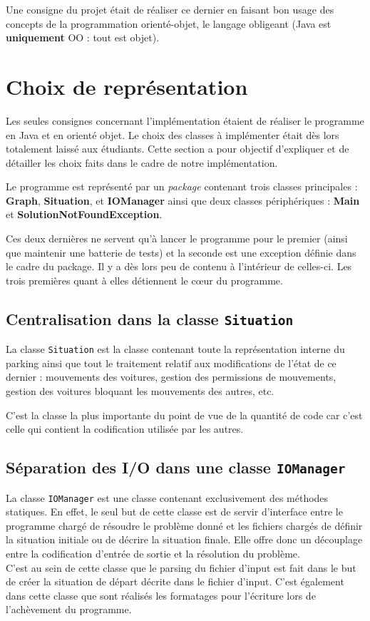 \documentclass{article}
\begin{document}
        Une consigne du projet était de réaliser ce dernier en faisant bon usage des concepts de la programmation orienté-objet, le langage
        obligeant (Java est \textbf{uniquement} OO : tout est objet).

\section{Choix de représentation}
    Les seules consignes concernant l'implémentation étaient de réaliser le programme en Java et en orienté objet. Le choix des classes à implémenter était
    dès lors totalement laissé aux étudiants. Cette section a pour objectif d'expliquer et de détailler les choix faits dans le cadre de notre implémentation.

    Le programme est représenté par un \textit{package} contenant trois classes principales : \textbf{Graph}, \textbf{Situation}, et \textbf{IOManager}
    ainsi que deux classes périphériques : \textbf{Main} et \textbf{SolutionNotFoundException}.

    Ces deux dernières ne servent qu'à lancer le programme pour le premier (ainsi que maintenir une batterie de tests) et la seconde est une exception
    définie dans le cadre du package. Il y a dès lors peu de contenu à l'intérieur de celles-ci. Les trois premières quant à elles détiennent le cœur du
    programme.

    \subsection{Centralisation dans la classe \texttt{Situation}}
        La classe \texttt{Situation} est la classe contenant toute la représentation interne du parking ainsi que tout le traitement relatif aux
        modifications de l'état de ce dernier : mouvements des voitures, gestion des permissions de mouvements, gestion des voitures bloquant
        les mouvements des autres, etc.

        C'est la classe la plus importante du point de vue de la quantité de code car c'est celle qui contient la codification utilisée par les autres.

    \subsection{Séparation des I/O dans une classe \texttt{IOManager}}
        La classe \texttt{IOManager} est une classe contenant exclusivement des méthodes statiques. En effet, le seul but de cette classe
        est de servir d'interface entre le programme chargé de résoudre le problème donné et les fichiers chargés de définir la situation
        initiale ou de décrire la situation finale. Elle offre donc un découplage entre la codification d'entrée de sortie et la résolution
		du problème.\\
		C'est au sein de cette classe que le parsing du fichier d'input est fait dans le but
        de créer la situation de départ décrite dans le fichier d'input. C'est également dans cette classe que sont réalisés les formatages
        pour l'écriture lors de l'achèvement du programme.
\end{document}
